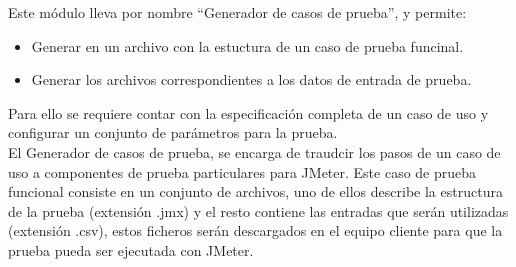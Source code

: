 	Este módulo lleva por nombre ``Generador de casos de prueba'', y permite: 
	
	\begin{itemize}
		\item Generar en un archivo con la estuctura de un caso de prueba funcinal.
		\item Generar los archivos correspondientes a los datos de entrada de prueba.
		
	\end{itemize}
	Para  ello se requiere contar con la especificación completa de un caso de uso y configurar un conjunto de parámetros para la prueba.\\

	El Generador de casos de prueba, se encarga de traudcir los pasos de un caso de uso a componentes de prueba particulares para JMeter. Este caso de prueba funcional consiste en un conjunto de archivos, uno de ellos describe la estructura de la prueba (extensión .jmx) y el resto contiene las entradas que serán utilizadas (extensión .csv), estos ficheros serán descargados en el equipo cliente para que la prueba pueda ser ejecutada con JMeter.\\\\
